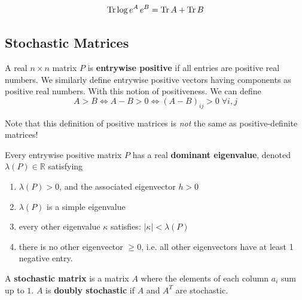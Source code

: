   \begin{corollary}
    \begin{equation}
      \operatorname{Tr}{\log{e^A \, e^B}} = \operatorname{Tr}{A} + \operatorname{Tr}{B}
    \end{equation}
  \end{corollary}

\subsection{Stochastic Matrices}

  \begin{definition}
    A real $n \times n$ matrix $P$ is \textbf{entrywise positive} if all entries are positive real numbers. We similarly define entrywise positive vectors having components as positive real numbers. With this notion of positiveness. We can define
    \begin{equation}
      A > B \iff A - B > 0 \iff (A-B)_{i j} > 0 \; \forall i, j
    \end{equation}
  \end{definition}

  Note that this definition of positive matrices is \textit{not} the same as positive-definite matrices! 

  \begin{theorem}
    Every entrywise positive matrix $P$ has a real \textbf{dominant eigenvalue}, denoted $\lambda(P) \in \mathbb{R}$ satisfying
    \begin{enumerate}
      \item $\lambda(P) > 0$, and the associated eigenvector $h >0$
      \item $\lambda(P)$ is a simple eigenvalue
      \item every other eigenvalue $\kappa$ satisfies: $|\kappa| < \lambda(P)$
      \item there is no other eigenvector $\geq 0$, i.e. all other eigenvectors have at least 1 negative entry.
    \end{enumerate}
  \end{theorem}

  \begin{definition}
    A \textbf{stochastic matrix} is a matrix $A$ where the elements of each column $a_i$ sum up to $1$. $A$ is \textbf{doubly stochastic} if $A$ and $A^T$ are stochastic. 
  \end{definition}

